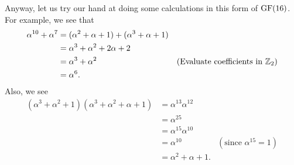 \begin{example}
    Anyway, let us try our hand at doing some calculations in this form of $\mathrm{GF}(16)$. For example, we see that
    \begin{align*}
        \alpha^{10} + \alpha^7 &= (\alpha^2 + \alpha + 1) + (\alpha^3 + \alpha + 1)\\
        &= \alpha^3 + \alpha^2 + 2\alpha + 2\\
        &= \alpha^3 + \alpha^2 & (\text{Evaluate coefficients in }\mathbb{Z}_2)\\
        &= \alpha^6.
    \end{align*}
    Also, we see
    \begin{align*}
        (\alpha^3 + \alpha^2 + 1)(\alpha^3 + \alpha^2 + \alpha + 1) &= \alpha^{13}\alpha^{12}\\
        &= \alpha^{25}\\
        &= \alpha^{15}\alpha^{10}\\
        &= \alpha^{10} & (\text{since }\alpha^{15} = 1)\\
        &= \alpha^2 + \alpha + 1.
    \end{align*}
\end{example}

